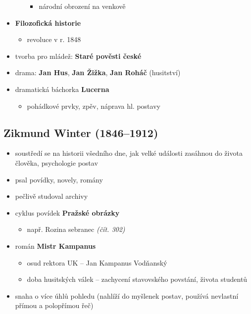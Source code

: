 \begin{itemize}
\begin{itemize}
		\begin{itemize}
		\item národní obrození na venkově
		\end{itemize}
	\end{itemize}
\item \textbf{Filozofická historie}
	\begin{itemize}
	\item revoluce v r. 1848
	\end{itemize}
\item tvorba pro mládež: \textbf{Staré pověsti české}
\item drama: \textbf{Jan Hus}, \textbf{Jan Žižka}, \textbf{Jan Roháč} (husitství)
\item dramatická báchorka \textbf{Lucerna}
	\begin{itemize}
	\item pohádkové prvky, zpěv, náprava hl. postavy
	\end{itemize}
\end{itemize}

\subsection{Zikmund Winter (1846--1912)}
\begin{itemize}
\item soustředí se na historii všedního dne, jak velké události zasáhnou do života člověka, psychologie postav
\item psal povídky, novely, romány
\item pečlivě studoval archivy
\item cyklus povídek \textbf{Pražské obrázky}
	\begin{itemize}
	\item např. Rozina sebranec \textit{(čít. 302)}
	\end{itemize}
\item román \textbf{Mistr Kampanus}
	\begin{itemize}
	\item osud rektora UK -- Jan Kampanus Vodňanský
	\item doba husitských válek -- zachycení stavovského povstání, života studentů
	\end{itemize}
\item snaha o více úhlů pohledu (nahlíží do myšlenek postav, používá nevlastní přímou a polopřímou řeč)
\end{itemize}

